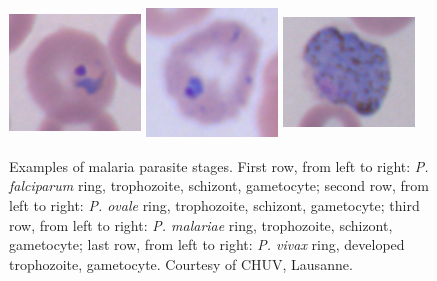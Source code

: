 \documentclass[final,a4paper,12pt,english]{UnicaPhdThesis3}
\begin{document}
\begin{figure}[H]
	\includegraphics[width=3.5cm, height=3.5cm]{images/malaria/vivax_1_ring}
	\includegraphics[width=3.5cm, height=3.5cm]{images/malaria/vivax_2c_trophozoiteDeveloped}
	\includegraphics[width=3.5cm, height=3.5cm]{images/malaria/vivax_4_gametocyte}
	\caption{\label{fig:malaria_stages}Examples of malaria parasite stages.
		First row, from left to right: \emph{P. falciparum} ring, trophozoite, schizont, gametocyte;
		second row, from left to right: \emph{P. ovale} ring, trophozoite, schizont, gametocyte;
		third row, from left to right: \emph{P. malariae} ring, trophozoite, schizont, gametocyte;
		last row, from left to right: \emph{P. vivax} ring, developed trophozoite, gametocyte.
		Courtesy of CHUV, Lausanne.}
\end{figure}
\end{document}
